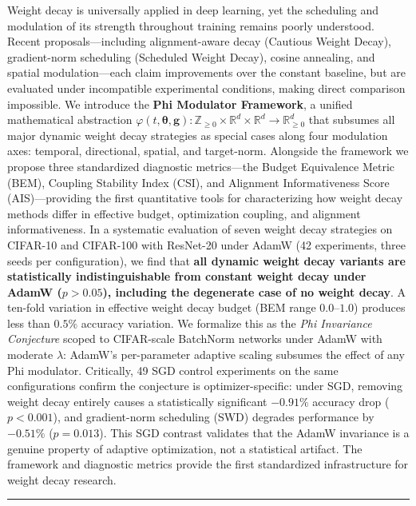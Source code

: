 \documentclass[
]{article}
\begin{document}
Weight decay is universally applied in deep learning, yet the scheduling
and modulation of its strength throughout training remains poorly
understood. Recent proposals---including alignment-aware decay (Cautious
Weight Decay), gradient-norm scheduling (Scheduled Weight Decay), cosine
annealing, and spatial modulation---each claim improvements over the
constant baseline, but are evaluated under incompatible experimental
conditions, making direct comparison impossible. We introduce the
\textbf{Phi Modulator Framework}, a unified mathematical abstraction
\(\varphi(t, \boldsymbol{\theta}, \mathbf{g}) : \mathbb{Z}_{\geq 0} \times \mathbb{R}^d \times \mathbb{R}^d \to \mathbb{R}^d_{\geq 0}\)
that subsumes all major dynamic weight decay strategies as special cases
along four modulation axes: temporal, directional, spatial, and
target-norm. Alongside the framework we propose three standardized
diagnostic metrics---the Budget Equivalence Metric (BEM), Coupling
Stability Index (CSI), and Alignment Informativeness Score
(AIS)---providing the first quantitative tools for characterizing how
weight decay methods differ in effective budget, optimization coupling,
and alignment informativeness. In a systematic evaluation of seven
weight decay strategies on CIFAR-10 and CIFAR-100 with ResNet-20 under
AdamW (42 experiments, three seeds per configuration), we find that
\textbf{all dynamic weight decay variants are statistically
indistinguishable from constant weight decay under AdamW (\(p > 0.05\)),
including the degenerate case of no weight decay}. A ten-fold variation
in effective weight decay budget (BEM range \(0.0\)--\(1.0\)) produces
less than \(0.5\%\) accuracy variation. We formalize this as the
\emph{Phi Invariance Conjecture} scoped to CIFAR-scale BatchNorm
networks under AdamW with moderate \(\lambda\): AdamW's per-parameter
adaptive scaling subsumes the effect of any Phi modulator. Critically,
49 SGD control experiments on the same configurations confirm the
conjecture is optimizer-specific: under SGD, removing weight decay
entirely causes a statistically significant \(-0.91\%\) accuracy drop
(\(p < 0.001\)), and gradient-norm scheduling (SWD) degrades performance
by \(-0.51\%\) (\(p = 0.013\)). This SGD contrast validates that the
AdamW invariance is a genuine property of adaptive optimization, not a
statistical artifact. The framework and diagnostic metrics provide the
first standardized infrastructure for weight decay research.

\begin{center}\rule{0.5\linewidth}{0.5pt}\end{center}
\end{document}
